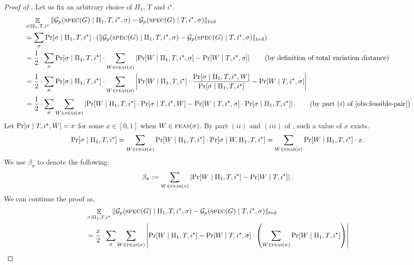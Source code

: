 \documentclass[11pt]{article}
\theoremstyle{definition}
\newcommand{\tvd}[2]{\ensuremath{\norm{#1 - #2}_{\mathrm{tvd}}}}
\newcommand{\paren}[1]{\ensuremath{\left(#1\right)}\xspace}
\newcommand{\card}[1]{\left\vert{#1}\right\vert}
\newcommand{\norm}[1]{\ensuremath{\|#1\|}}
\DeclareMathOperator*{\Exp}{\ensuremath{{\mathbb{E}}}}
\DeclareMathOperator*{\Prob}{\ensuremath{\textnormal{Pr}}}
\renewcommand{\Pr}{\Prob}
\newcommand{\cG}{\ensuremath{\mathcal{G}}}
\newcommand{\spec}{\ensuremath{\textnormal{\textsc{spec}}}}
\newcommand{\istar}{\ensuremath{i^{\star}}}
\newcommand{\Prot}{\ensuremath{\Pi}}
\begin{document}
	\begin{proof}[Proof of ]
		Let us fix an arbitrary choice of $\Prot_1$, $T$ and $\istar$. 
		\begin{align*}
			&\Exp_{\sigma \mid \Prot_1, T, \istar}	\tvd{\cG_p(\spec(G) \mid \Prot_1, T, \istar,\sigma)}{\cG_p(\spec(G) \mid T, \istar, \sigma)} \\
			&= \sum_{\sigma} \Pr[\sigma \mid \Prot_1, T, \istar] \cdot \paren{	\tvd{\cG_p(\spec(G) \mid \Prot_1, T, \istar,\sigma)}{\cG_p(\spec(G) \mid T, \istar, \sigma)}} \\
			&=\frac12 \cdot \sum_{\sigma} \Pr[\sigma \mid \Prot_1, T, \istar] \cdot \sum_{W \in \feas(\sigma)} \card{\Pr[W \mid \Prot_1, T, \istar, \sigma] - \Pr[W \mid T, \istar, \sigma ]} \tag{by definition of total variation distance} \\
			&= \frac12 \cdot \sum_{\sigma} \Pr[\sigma \mid \Prot_1, T, \istar] \cdot \sum_{W \in \feas(\sigma)} \card{\Pr[W \mid \Prot_1, T, \istar] \cdot \frac{\Pr[\sigma \mid \Prot_1, T, \istar, W]}{\Pr[\sigma \mid \Prot_1, T, \istar]} - \Pr[W \mid T, \istar, \sigma ]}  \\
			&= \frac12 \cdot \sum_{\sigma} \sum_{W \in \feas(\sigma)} \card{\Pr[W \mid \Prot_1, T, \istar] \cdot \Pr[\sigma \mid T, \istar, W]- \Pr[W \mid T, \istar, \sigma ] \cdot \Pr[\sigma \mid \Prot_1, T, \istar] }. \tag{by part $(i)$ of \Cref{obs:feasible-pair}}
		\end{align*}
		Let $\Pr[\sigma \mid T, \istar, W] = x $ for some $x \in [0,1]$ when $W \in \textnormal{\textsc{feas}}(\sigma)$. By part $(ii)$ and $(iii)$ of , such a value of $x$ exists. 
		\begin{align*}
			\Pr[\sigma \mid \Prot_1, T, \istar] = \sum_{W \in \feas(\sigma)} \Pr[W \mid \Prot_1, T, \istar] \cdot \Pr[\sigma \mid W, \Prot_1, T, \istar] = \sum_{W \in \feas(\sigma)} \Pr[W \mid \Prot_1, T, \istar] \cdot x. 
		\end{align*}
		We use $\beta_{\sigma}$ to denote the following:
		\[
		\beta_{\sigma}:= \sum_{W \in \feas(\sigma)} \card{\Pr[W \mid \Prot_1, T, \istar] - \Pr[W \mid T, \istar]}.
		\]
		We can continue the proof as, 
		\begin{align*}
			&\Exp_{\sigma \mid \Prot_1, T, \istar}	\tvd{\cG_p(\spec(G) \mid \Prot_1, T, \istar,\sigma)}{\cG_p(\spec(G) \mid T, \istar, \sigma)} \\
			&= \frac{x}2 \cdot  \sum_{\sigma} \sum_{W \in \feas(\sigma)} \card{\Pr[W \mid \Prot_1, T, \istar]- \Pr[W \mid T, \istar, \sigma ] \cdot \paren{ \sum_{W \in \feas(\sigma)} \Pr[W \mid \Prot_1, T, \istar]}} \\

\end{align*}
\end{proof}
\end{document}
